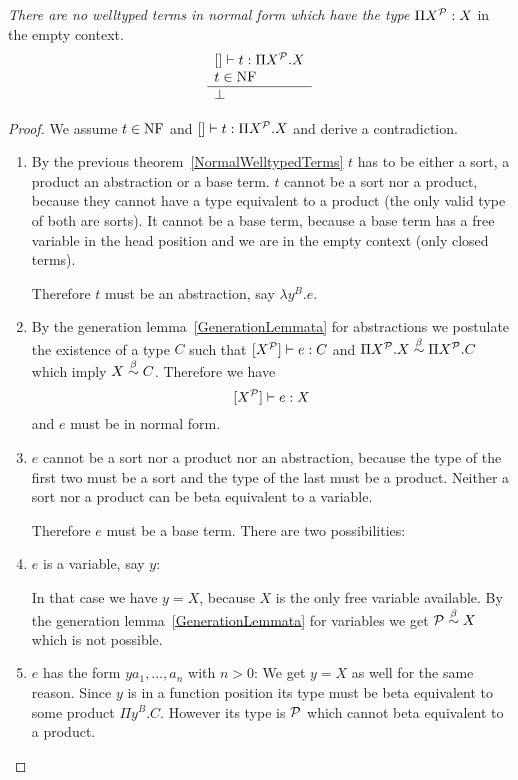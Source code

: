 \begin{theorem}
    \emph{There are no welltyped terms in normal form which have the
    type $\Pi X^{\cal P} : X$} in the empty context.
    $$
    \begin{array}{l} 
        [] \vdash t: \Pi X^{\cal P}. X
        \\
        t \in \text{NF}
     \\ \hline \perp\end{array}
    $$

    \begin{proof}
        We assume $t \in \text{NF}$ and $[] \vdash t : \Pi X^{\cal P}. X$ and derive a
        contradiction.

        \begin{enumerate}
            \item By the previous theorem~\ref{NormalWelltypedTerms} $t$ has to
                be either a sort, a product an abstraction or a base term. $t$
                cannot be a sort nor a product, because they cannot have a type
                equivalent to a product (the only valid type of both are sorts).
                It cannot be a base term, because a base term has a free
                variable in the head position and we are in the empty context
                (only closed terms).

                Therefore $t$ must be an abstraction, say $\lambda y^B.e$.

            \item By the generation lemma~\ref{GenerationLemmata} for
                abstractions we postulate the existence of a type $C$ such
                that $[X^{\cal P}] \vdash e : C$ and $\Pi X^{\cal P}. X \stackrel{\beta}{\sim} \Pi
                X^{\cal P}.C$ which imply $X \stackrel{\beta}{\sim} C$. Therefore we have
                $$
                [X^{\cal P}] \vdash e : X
                $$ and $e$ must be in normal form.

            \item $e$ cannot be a sort nor a product nor an abstraction, because
                the type of the first two must be a sort and the type of the
                last must be a product. Neither a sort nor a product can be beta
                equivalent to a variable.

                Therefore $e$ must be a base term. There are two possibilities:

            \item $e$ is a variable, say $y$:

                In that case we have $y = X$, because $X$ is the only free
                variable available. By the generation
                lemma~\ref{GenerationLemmata} for variables we get ${\cal P}
                \stackrel{\beta}{\sim} X$ which is not possible.

            \item $e$ has the form $y a_1, \ldots, a_n$ with $n > 0$: We get $y
                = X$ as well for the same reason. Since $y$ is in a function
                position its type must be beta equivalent to some product $\Pi
                y^B.C$. However its type is ${\cal P}$ which cannot beta equivalent
                to a product.
        \end{enumerate}
    \end{proof}
\end{theorem}
